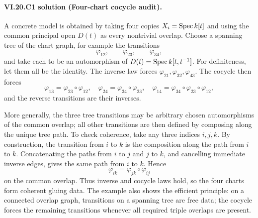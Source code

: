 
\paragraph{VI.20.C1 solution (Four-chart cocycle audit).}
\begin{solution}
A concrete model is obtained by taking four copies $X_i=\operatorname{Spec} k[t]$ and using the common principal open $D(t)$ as every nontrivial overlap.  Choose a spanning tree of the chart graph, for example the transitions
\[
\varphi_{12},\qquad \varphi_{23},\qquad \varphi_{34},
\]
and take each to be an automorphism of $D(t)=\operatorname{Spec} k[t,t^{-1}]$.  For definiteness, let them all be the identity.  The inverse law forces $\varphi_{21},\varphi_{32},\varphi_{43}$.  The cocycle then forces
\[
\varphi_{13}=\varphi_{23}\circ\varphi_{12},\quad
\varphi_{24}=\varphi_{34}\circ\varphi_{23},\quad
\varphi_{14}=\varphi_{34}\circ\varphi_{23}\circ\varphi_{12},
\]
and the reverse transitions are their inverses.

More generally, the three tree transitions may be arbitrary chosen automorphisms of the common overlap; all other transitions are then defined by composing along the unique tree path.  To check coherence, take any three indices $i,j,k$.  By construction, the transition from $i$ to $k$ is the composition along the path from $i$ to $k$.  Concatenating the paths from $i$ to $j$ and $j$ to $k$, and cancelling immediate inverse edges, gives the same path from $i$ to $k$.  Hence
\[
\varphi_{ik}=\varphi_{jk}\circ\varphi_{ij}
\]
on the common overlap.  Thus inverse and cocycle laws hold, so the four charts form coherent gluing data.  The example also shows the efficient principle: on a connected overlap graph, transitions on a spanning tree are free data; the cocycle forces the remaining transitions whenever all required triple overlaps are present.
\end{solution}

